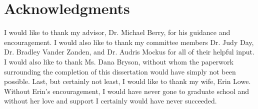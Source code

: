 \chapter*{Acknowledgments}
I would like to thank my advisor, Dr. Michael Berry, for his guidance
and encouragement.  I would also like to thank my committee members
Dr. Judy Day, Dr. Bradley Vander Zanden, and Dr. Audris Mockus for all
of their helpful input.  I would also like to thank Ms. Dana Bryson,
without whom the paperwork surrounding the completion of this
dissertation would have simply not been possible.  Last, but certainly
not least, I would like to thank my wife, Erin Lowe.  Without Erin's
encouragement, I would have never gone to graduate school and without
her love and support I certainly would have never succeeded.
